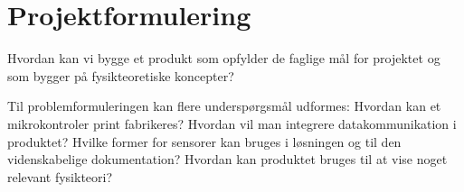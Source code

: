 \section{Projektformulering}

Hvordan kan vi bygge et produkt som opfylder de faglige mål for projektet og som bygger på fysikteoretiske koncepter?

Til problemformuleringen kan flere underspørgsmål udformes:
Hvordan kan et mikrokontroler print fabrikeres?
Hvordan vil man integrere datakommunikation i produktet? 
Hvilke former for sensorer kan bruges i løsningen og til den videnskabelige dokumentation?
Hvordan kan produktet bruges til at vise noget relevant fysikteori?
